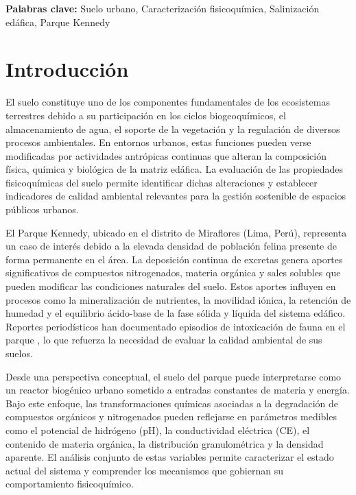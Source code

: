 \documentclass[fleqn]{jaes}
\renewenvironment{keywords}{\par\addvspace{11pt}\noindent\textbf{Palabras clave: }\keywordsfont\ignorespaces}{\par\addvspace{0pt}}
\begin{document}
\begin{keywords}
Suelo urbano, Caracterización fisicoquímica, Salinización edáfica, Parque Kennedy
\end{keywords}

\section{Introducción}\label{sec:intro}

El suelo constituye uno de los componentes fundamentales de los ecosistemas terrestres debido a su participación en los ciclos biogeoquímicos, el almacenamiento de agua, el soporte de la vegetación y la regulación de diversos procesos ambientales. En entornos urbanos, estas funciones pueden verse modificadas por actividades antrópicas continuas que alteran la composición física, química y biológica de la matriz edáfica. La evaluación de las propiedades fisicoquímicas del suelo permite identificar dichas alteraciones y establecer indicadores de calidad ambiental relevantes para la gestión sostenible de espacios públicos urbanos.

El Parque Kennedy, ubicado en el distrito de Miraflores (Lima, Perú), representa un caso de interés debido a la elevada densidad de población felina presente de forma permanente en el área. La deposición continua de excretas genera aportes significativos de compuestos nitrogenados, materia orgánica y sales solubles que pueden modificar las condiciones naturales del suelo. Estos aportes influyen en procesos como la mineralización de nutrientes, la movilidad iónica, la retención de humedad y el equilibrio ácido-base de la fase sólida y líquida del sistema edáfico. Reportes periodísticos han documentado episodios de intoxicación de fauna en el parque \cite{CentrodeMedicinaVeterinariaForense2023}, lo que refuerza la necesidad de evaluar la calidad ambiental de sus suelos.

Desde una perspectiva conceptual, el suelo del parque puede interpretarse como un reactor biogénico urbano sometido a entradas constantes de materia y energía. Bajo este enfoque, las transformaciones químicas asociadas a la degradación de compuestos orgánicos y nitrogenados pueden reflejarse en parámetros medibles como el potencial de hidrógeno (pH), la conductividad eléctrica (CE), el contenido de materia orgánica, la distribución granulométrica y la densidad aparente. El análisis conjunto de estas variables permite caracterizar el estado actual del sistema y comprender los mecanismos que gobiernan su comportamiento fisicoquímico.
\end{document}
